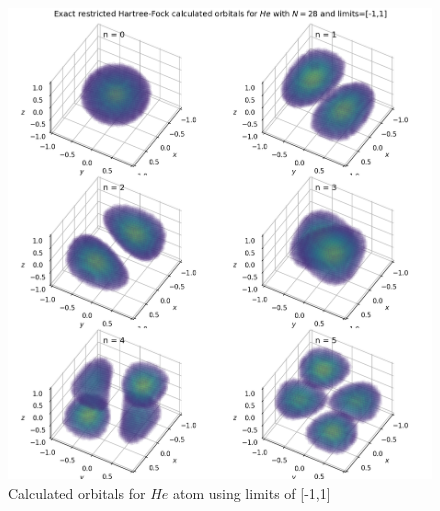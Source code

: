 \documentclass[10pt, oneside, letterpaper]{article}
\begin{document}
\begin{figure}[H]
  \begin{center}
    \includegraphics[scale=0.75]{he_N28_l1.png}
  \end{center}
  \caption{Calculated orbitals for $He$ atom using limits of [-1,1]}
  \label{he-plot-l1}
\end{figure}
\end{document}

